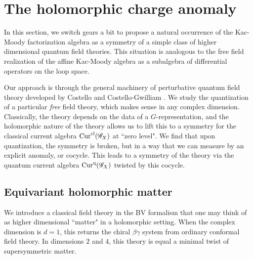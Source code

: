 \section{The holomorphic charge anomaly} \label{sec: qft}

In this section, we switch gears a bit to propose a natural occurrence of the Kac-Moody factorization algebra as a symmetry of a simple class of higher dimensional quantum field theories. 
This situation is analogous to the free field realization of the affine Kac-Moody algebra as a subalgebra of differential operators on the loop space. 

Our approach is through the general machinery of perturbative quantum field theory developed by Costello \cite{CosBook} and Costello-Gwilliam \cite{CG1,CG2}.
We study the quantization of a particular {\em free} field theory, which makes sense in any complex dimension.
Classically, the theory depends on the data of a $G$-representation, and the holomorphic nature of the theory allows us to lift this to a symmetry for the classical current algebra ${\rm Cur}^{{\rm cl}}(\mathscr G_X)$ at ``zero level". 
We find that upon quantization, the symmetry is broken, but in a way that we can measure by an explicit anomaly, or cocycle. 
This leads to a symmetry of the theory via the quantum current algebra ${\rm Cur}^{{\rm q}}(\mathscr G_X)$ twisted by this cocycle.  
 
%
%
%

\subsection{Equivariant holomorphic matter}

We introduce a classical field theory in the BV formalism that one may think of as higher dimensional ``matter" in a holomorphic setting. 
When the complex dimension is $d = 1$, this returns the chiral $\beta\gamma$ system from ordinary conformal field theory. 
In dimensions $2$ and $4$, this theory is equal a minimal twist of supersymmetric matter. 

